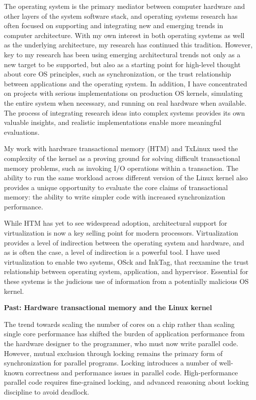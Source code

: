 \documentclass{article}
\newcommand{\osck}{OSck\xspace}
\newcommand{\inktag}{InkTag\xspace}
\begin{document}
The operating system is the primary mediator between computer hardware and
other layers of the system software stack, and operating systems research
has often focused on supporting and integrating new and emerging trends in
computer architecture. With my own interest in both operating systems as
well as the underlying architecture, my research has continued this
tradition.  However, key to my research has been using emerging
architectural trends not only as a new target to be supported, but also as
a starting point for high-level thought about core OS principles, such as
synchronization, or the trust relationship
between applications and the operating system. In addition, I have
concentrated on projects with serious implementations on production OS
kernels, simulating the entire system when necessary, and running on real
hardware when available. The process of integrating research ideas into
complex systems provides its own valuable insights, and realistic
implementations enable more meaningful evaluations.

My work with hardware transactional memory (HTM) and TxLinux
used the complexity of the kernel as a proving ground for solving difficult
transactional memory problems, such as invoking I/O operations within a
transaction. The ability to run the same workload across different version
of the Linux kernel also provides a unique opportunity to evaluate the core
claims of transactional memory: the ability to write simpler code with
increased synchronization performance.

While HTM has yet to see widespread adoption, architectural support for
virtualization is now a key selling point for modern processors.
Virtualization provides a level of indirection between the operating
system and hardware, and as is often the case, a level
of indirection is a powerful tool. I have used virtualization to enable two
systems, \osck and \inktag, that reexamine the trust relationship between
operating system, application, and hypervisor. Essential for these systems
is the judicious use of information from a potentially malicious OS kernel.

{\bigskip \noindent\bf Past: Hardware transactional memory and the Linux
kernel}

\noindent
The trend towards scaling the number of cores on a chip rather than scaling
single core performance has shifted the burden of application performance
from the hardware designer to the programmer, who must now write parallel
code.
However, mutual exclusion through locking remains the primary form of
synchronization for parallel programs. Locking introduces a number of
well-known correctness and performance issues in parallel code.
High-performance parallel code requires fine-grained locking, and advanced
reasoning about locking discipline to avoid deadlock.
\end{document}

